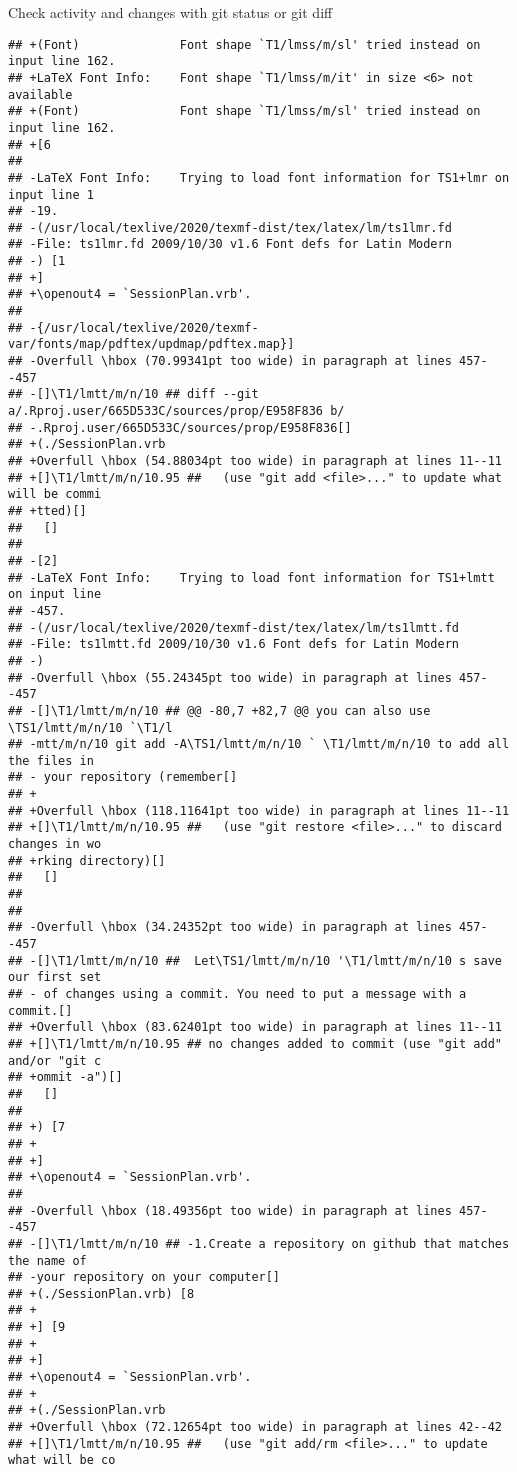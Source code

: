 \documentclass[ignorenonframetext,]{beamer}
\begin{document}
\begin{frame}[fragile]{Check activity and changes with git status or git
diff}
\begin{verbatim}
## +(Font)              Font shape `T1/lmss/m/sl' tried instead on input line 162.
## +LaTeX Font Info:    Font shape `T1/lmss/m/it' in size <6> not available
## +(Font)              Font shape `T1/lmss/m/sl' tried instead on input line 162.
## +[6
##  
## -LaTeX Font Info:    Trying to load font information for TS1+lmr on input line 1
## -19.
## -(/usr/local/texlive/2020/texmf-dist/tex/latex/lm/ts1lmr.fd
## -File: ts1lmr.fd 2009/10/30 v1.6 Font defs for Latin Modern
## -) [1
## +]
## +\openout4 = `SessionPlan.vrb'.
##  
## -{/usr/local/texlive/2020/texmf-var/fonts/map/pdftex/updmap/pdftex.map}]
## -Overfull \hbox (70.99341pt too wide) in paragraph at lines 457--457
## -[]\T1/lmtt/m/n/10 ## diff --git a/.Rproj.user/665D533C/sources/prop/E958F836 b/
## -.Rproj.user/665D533C/sources/prop/E958F836[] 
## +(./SessionPlan.vrb
## +Overfull \hbox (54.88034pt too wide) in paragraph at lines 11--11
## +[]\T1/lmtt/m/n/10.95 ##   (use "git add <file>..." to update what will be commi
## +tted)[] 
##   []
##  
## -[2]
## -LaTeX Font Info:    Trying to load font information for TS1+lmtt on input line 
## -457.
## -(/usr/local/texlive/2020/texmf-dist/tex/latex/lm/ts1lmtt.fd
## -File: ts1lmtt.fd 2009/10/30 v1.6 Font defs for Latin Modern
## -)
## -Overfull \hbox (55.24345pt too wide) in paragraph at lines 457--457
## -[]\T1/lmtt/m/n/10 ## @@ -80,7 +82,7 @@ you can also use \TS1/lmtt/m/n/10 `\T1/l
## -mtt/m/n/10 git add -A\TS1/lmtt/m/n/10 ` \T1/lmtt/m/n/10 to add all the files in
## - your repository (remember[] 
## +
## +Overfull \hbox (118.11641pt too wide) in paragraph at lines 11--11
## +[]\T1/lmtt/m/n/10.95 ##   (use "git restore <file>..." to discard changes in wo
## +rking directory)[] 
##   []
##  
##  
## -Overfull \hbox (34.24352pt too wide) in paragraph at lines 457--457
## -[]\T1/lmtt/m/n/10 ##  Let\TS1/lmtt/m/n/10 '\T1/lmtt/m/n/10 s save our first set
## - of changes using a commit. You need to put a message with a commit.[] 
## +Overfull \hbox (83.62401pt too wide) in paragraph at lines 11--11
## +[]\T1/lmtt/m/n/10.95 ## no changes added to commit (use "git add" and/or "git c
## +ommit -a")[] 
##   []
##  
## +) [7
## +
## +]
## +\openout4 = `SessionPlan.vrb'.
##  
## -Overfull \hbox (18.49356pt too wide) in paragraph at lines 457--457
## -[]\T1/lmtt/m/n/10 ## -1.Create a repository on github that matches the name of 
## -your repository on your computer[] 
## +(./SessionPlan.vrb) [8
## +
## +] [9
## +
## +]
## +\openout4 = `SessionPlan.vrb'.
## +
## +(./SessionPlan.vrb
## +Overfull \hbox (72.12654pt too wide) in paragraph at lines 42--42
## +[]\T1/lmtt/m/n/10.95 ##   (use "git add/rm <file>..." to update what will be co

\end{verbatim}
\end{frame}
\end{document}

